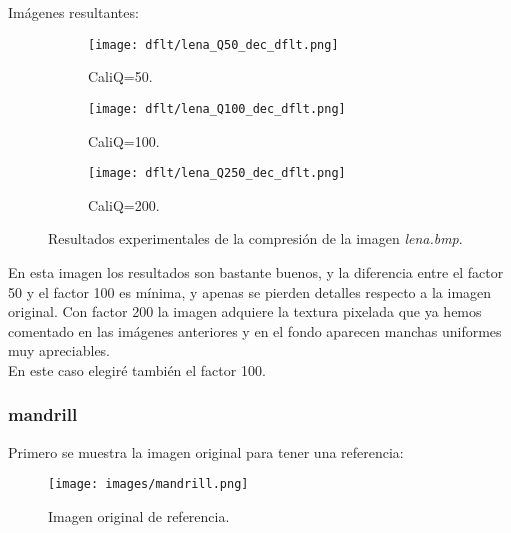 \documentclass[12pt,a4paper]{article}
\begin{document}
    \vspace{0.5cm}
    
Imágenes resultantes:
\begin{figure}   [H]
    \begin{subfigure}{0.30\textwidth}
        \centering
        \texttt{[image: dflt/lena\_Q50\_dec\_dflt.png]}
        \caption{CaliQ=50.}
        
    \end{subfigure}
    \hfill
    \begin{subfigure}{0.30\textwidth}
        \centering
        \texttt{[image: dflt/lena\_Q100\_dec\_dflt.png]}
        \caption{CaliQ=100.}
        
    \end{subfigure}
    \hfill
    \begin{subfigure}{0.30\textwidth}
        \centering
        \texttt{[image: dflt/lena\_Q250\_dec\_dflt.png]}
        \caption{CaliQ=200.}
        
    \end{subfigure}
    
    \caption[Resultados experimentales - lena]{Resultados experimentales de la compresión de la imagen \textit{lena.bmp}.}
    
\end{figure}

En esta imagen los resultados son bastante buenos, y la diferencia entre el factor 50 y el factor 100 es mínima, y apenas se pierden detalles respecto a la imagen original. Con factor 200 la imagen adquiere la textura pixelada que ya hemos comentado en las imágenes anteriores y en el fondo aparecen manchas uniformes muy apreciables.\\ 

En este caso elegiré también el factor 100.

\subsubsection{mandrill}
Primero se muestra la imagen original para tener una referencia:
\begin{figure}[H]
    \centering
    \texttt{[image: images/mandrill.png]}
    \caption[Referencia - mandrill]{Imagen original de referencia.}
    
\end{figure}
    
    \vspace{0.5cm}
\end{document}
